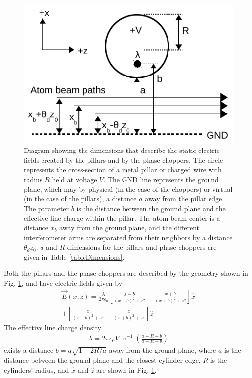 \documentclass[twocolumn,prl,showpacs,superscriptaddress]{revtex4-1}   %
\newcommand{\figref}[1]{Fig. \ref{#1}}
\begin{document}
\begin{figure}
\includegraphics[width=\linewidth,keepaspectratio]{EDiagram1.pdf}
\caption{\label{EDiagram}Diagram showing the dimensions that describe the static electric fields created by the pillars and by the phase choppers. The circle represents the cross-section of a metal pillar or charged wire with radius $R$ held at voltage $V$. The GND line represents the ground plane, which may by physical (in the case of the choppers) or virtual (in the case of the pillars), a distance $a$ away from the pillar edge. The parameter $b$ is the distance between the ground plane and the effective line charge within the pillar. The atom beam center is a distance $x_b$ away from the ground plane, and the different interferometer arms are separated from their neighbors by a distance $\theta_d z_0$. $a$ and $R$ dimensions for the pillars and phase choppers are given in Table \ref{tableDimensions}.}
\end{figure}

Both the pillars and the phase choppers are described by the geometry shown in \figref{EDiagram}, and have electric fields given by
\begin{align}
	\vec{E}(x,z) = \frac{\lambda}{2\pi\epsilon_0}
	\left[	
		\frac{x-b}{(x-b)^2+z^2} - \frac{x+b}{(x+b)^2+z^2}
	\right] \hat{x} \nonumber \\
	+ 
	\left[	
		\frac{z}{(x-b)^2+z^2} - \frac{z}{(x+b)^2+z^2}
	\right] \hat{z}
	\label{EPillars}
\end{align}
The effective line charge density
\begin{align}
	\lambda = 2\pi\epsilon_0V\ln^{-1}
	\left(
		\frac{a+R+b}{a+R-b}
	\right)
	\label{lambda}
\end{align}
exists a distance $b = a\sqrt{1+2R/a}$ away from the ground plane, where $a$ is the distance between the ground plane and the closest cylinder edge, $R$ is the cylinders' radius, and $\hat{x}$ and $\hat{z}$ are shown in \figref{EDiagram}.
\end{document}
